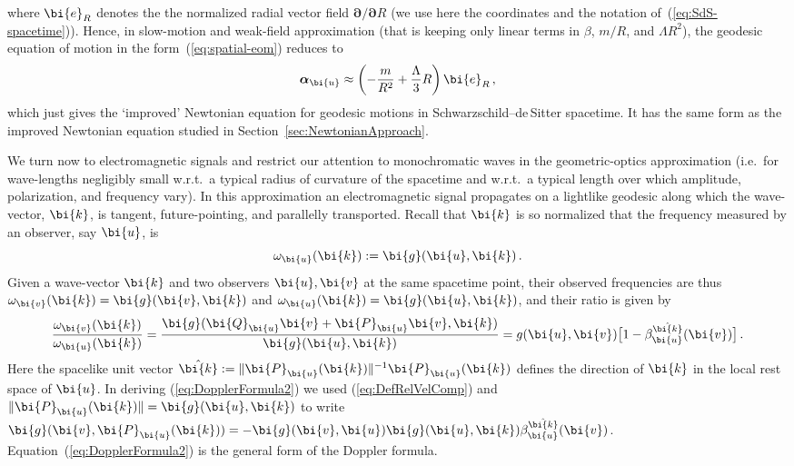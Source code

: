 \documentclass
[rmp,aps,twocolumn,showpacs,preprintnumbers,amsmath,amssymb]{revtex4}
\theoremstyle{plain}
\theoremstyle{definition}
\theoremstyle{remark}
\newcommand{\norm}[1]{\lVert#1\rVert}         %
\newcommand{\bpartial}{\boldsymbol{\partial}} %
\newcommand{\g}{\bg}                            %
\newcommand{\be}{\bi{e}}
\newcommand{\bg}{\bi{g}}
\newcommand{\bk}{\bi{k}}
\newcommand{\bu}{\bi{u}}
\newcommand{\bv}{\bi{v}}
\newcommand{\bP}{\bi{P}}
\newcommand{\bQ}{\bi{Q}}
\newcommand{\balpha}{\boldsymbol{\alpha}}
\begin{document}
%
where $\be_R$ denotes the 
the normalized radial vector field $\bpartial/\bpartial R$ (we use here 
the coordinates and the notation of~(\ref{eq:SdS-spacetime})). Hence, in 
slow-motion and weak-field approximation (that is keeping only linear 
terms in $\beta$, $m/R$, and $\Lambda R^2$), the geodesic equation of 
motion in the form~(\ref{eq:spatial-eom}) reduces to 
%
\begin{equation}\label{eq:geod-eq-SdS-spatial}
  \balpha_\bu \approx \left( -\frac{m}{R^2}+\frac{\Lambda}{3}R \right)\be_R\,,
\end{equation}
%
which just gives the `improved' Newtonian equation for geodesic motions 
in Schwarzschild--de\,Sitter spacetime. It has the same form as the 
improved Newtonian equation studied in Section~\ref{sec:NewtonianApproach}. 

We turn now to electromagnetic signals and restrict our attention to 
monochromatic waves in the geometric-optics approximation (i.e.~for 
wave-lengths negligibly small w.r.t.~a typical radius of curvature of the 
spacetime and w.r.t.~a typical length over which amplitude, polarization, 
and frequency vary). In this approximation an electromagnetic signal 
propagates on a lightlike geodesic along which the wave-vector, $\bk$, 
is tangent, future-pointing, and parallelly transported. Recall that 
$\bk$ is so normalized that the frequency measured by an 
observer, say $\bu$, is 
%
\begin{equation}\label{eq:Def-frequency}
  \omega_\bu(\bk):=\bg(\bu,\bk)\,.
\end{equation}
%
Given a wave-vector $\bk$ and two observers $\bu,\bv$ at the same spacetime 
point, their observed frequencies are thus $\omega_\bv(\bk)=\bg(\bv,\bk)$ 
and $\omega_\bu(\bk)=\bg(\bu,\bk)$, and their ratio is given by 
%
\begin{equation}\label{eq:DopplerFormula2}
  \frac{\omega_\bv(\bk)}{\omega_\bu(\bk)}=
  \frac{\bg(\bQ_\bu\bv+\bP_\bu\bv,\bk)}{\bg(\bu,\bk)}=
  g(\bu,\bv)\bigl[ 1-\beta^{\hat\bk}_\bu(\bv) \bigr]\,.
\end{equation}
%
Here the spacelike unit vector $\hat\bk:=\norm{\bP_\bu(\bk)}^{-1}\bP_\bu(\bk)$ 
defines the direction of $\bk$ in the local rest space of $\bu$. In deriving 
(\ref{eq:DopplerFormula2}) we used (\ref{eq:DefRelVelComp}) 
and $\norm{\bP_\bu(\bk)}=\bg(\bu,\bk)$ to write 
$\g(\bv,\bP_\bu(\bk)) = -\bg(\bv,\bu)\bg(\bu,\bk)\beta^{\hat\bk}_{\bu}(\bv)$.
Equation~(\ref{eq:DopplerFormula2}) is the general form of the 
Doppler formula.  
\end{document}
